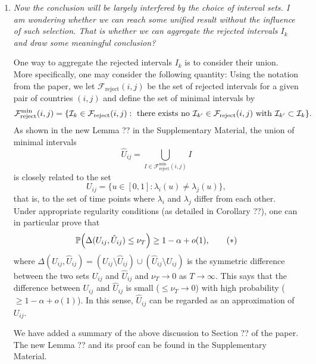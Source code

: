 \documentclass[a4paper,12pt]{article}
\begin{document}
\begin{enumerate}[label=(\arabic*),leftmargin=0.7cm]
\item \textit{Now the conclusion will be largely interfered by the choice of interval sets. I am wondering whether we can reach some unified result without the influence of such selection. That is whether we can aggregate the rejected intervals $I_k$ and draw some meaningful conclusion?}

One way to aggregate the rejected intervals $I_k$ is to consider their union. More specifically, one may consider the following quantity: Using the notation from the paper, we let $\mathcal{F}_{\text{reject}}(i,j)$ be the set of rejected intervals for a given pair of countries $(i,j)$ and define the set of minimal intervals by
\[ \mathcal{F}_{\text{reject}}^{\text{min}}(i,j) = \{ \mathcal{I}_k \in \mathcal{F}_{\text{reject}}(i,j): \text{ there exists no } \mathcal{I}_{k^\prime} \in \mathcal{F}_{\text{reject}}(i,j) \text{ with } \mathcal{I}_{k^\prime} \subset \mathcal{I}_k \}. \]
As shown in the new Lemma ?? in the Supplementary Material, the union of minimal intervals
\[ \hat{U}_{ij} = \bigcup_{I \in \mathcal{F}_{\text{reject}}^{\text{min}}(i,j)} I \]
is closely related to the set 
\[ U_{ij} = \{ u \in [0,1]: \lambda_i(u) \ne \lambda_j(u) \}, \] 
that is, to the set of time points where $\lambda_i$ and $\lambda_j$ differ from each other. Under appropriate regularity conditions (as detailed in Corollary ??), one can in particular prove that \begin{equation}\label{eq:Uij}
\mathbb{P} \Big( \Delta(U_{ij}, \hat{U}_{ij}) \le \nu_T \Big) \ge 1-\alpha + o(1), \tag{$*$}
\end{equation}
where $\Delta(U_{ij},\hat{U}_{ij}) = (U_{ij} \setminus \hat{U}_{ij}) \cup (\hat{U}_{ij} \setminus U_{ij})$ is the symmetric difference between the two sets $U_{ij}$ and $\hat{U}_{ij}$ and $\nu_T \to 0$ as $T \to \infty$. This says that the difference between $U_{ij}$ and $\hat{U}_{ij}$ is small ($\le \nu_T \to 0$) with high probability ($\ge 1 -\alpha + o(1)$). In this sense, $\hat{U}_{ij}$ can be regarded as an approximation of $U_{ij}$. 

{\color{red}
We have added a summary of the above discussion to Section ?? of the paper. The new Lemma ?? and its proof can be found in the Supplementary Material.
}


\end{enumerate}
\end{document}
